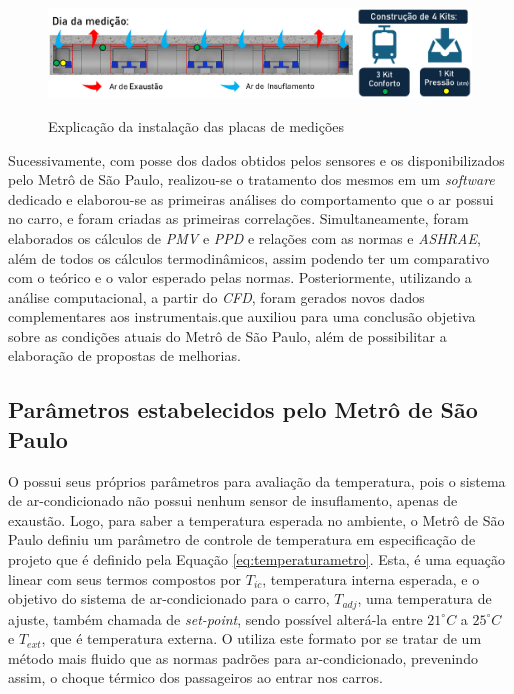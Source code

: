 \documentclass[acronym,symbols,table]{fei}
\begin{document}
\begin{figure}[!htb]
 \centering
    \caption{Explicação da instalação das placas de medições}
    \includegraphics[width=1\linewidth]{Imagens/metodo_de_medicao.png}
    \label{fig:metodo_de_medicao}
\end{figure}

Sucessivamente, com posse dos dados obtidos pelos sensores e os disponibilizados pelo Metrô de São Paulo, realizou-se o tratamento dos mesmos em um \textit{software} dedicado e elaborou-se as primeiras análises do comportamento que o ar possui no carro, e foram criadas as primeiras correlações. Simultaneamente, foram elaborados os cálculos de \textit{PMV} e \textit{PPD} e relações com as normas \textcite{abnt16655} e \textit{ASHRAE}, além de todos os cálculos termodinâmicos, assim podendo ter um comparativo com o teórico e o valor esperado pelas normas.  Posteriormente, utilizando a análise computacional, a partir do \textit{CFD}, foram gerados novos dados complementares aos instrumentais.que auxiliou para uma conclusão objetiva sobre as condições atuais do Metrô de São Paulo, além de possibilitar a elaboração de  propostas de melhorias.

\subsection{Parâmetros estabelecidos pelo Metrô de São Paulo}

O \textcite{metrosp2024} possui seus próprios parâmetros para avaliação da temperatura, pois o sistema de ar-condicionado não possui nenhum sensor de insuflamento, apenas de exaustão. Logo, para saber a temperatura esperada no ambiente, o Metrô de São Paulo definiu um parâmetro de controle de temperatura em  especificação de projeto que é definido pela Equação \ref{eq:temperaturametro}. Esta, é uma equação linear com seus termos compostos por $T_{ic}$, temperatura interna esperada, e o objetivo do sistema de ar-condicionado para o carro, $T_{adj}$, uma temperatura de ajuste, também chamada de \textit{set-point}, sendo possível alterá-la entre ${21}^\circ C$ a ${25}^\circ C$ e $T_{ext}$, que é temperatura externa. O \textcite{metrosp2024} utiliza este formato por se tratar de um método mais fluido que as normas padrões para ar-condicionado, prevenindo assim, o choque térmico dos passageiros ao entrar nos carros.
\end{document}
